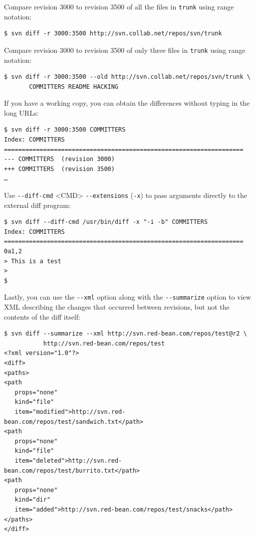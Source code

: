 Compare revision 3000 to revision 3500 of all the files in
\texttt{trunk} using range notation:

\begin{verbatim}
$ svn diff -r 3000:3500 http://svn.collab.net/repos/svn/trunk
\end{verbatim}

Compare revision 3000 to revision 3500 of only three files in
\texttt{trunk} using range notation:

\begin{verbatim}
$ svn diff -r 3000:3500 --old http://svn.collab.net/repos/svn/trunk \
       COMMITTERS README HACKING
\end{verbatim}

If you have a working copy, you can obtain the differences without
typing in the long URLs:

\begin{verbatim}
$ svn diff -r 3000:3500 COMMITTERS 
Index: COMMITTERS
===================================================================
--- COMMITTERS  (revision 3000)
+++ COMMITTERS  (revision 3500)
…
\end{verbatim}

Use \texttt{-\/-diff-cmd} \textless CMD\textgreater{}
\texttt{-\/-extensions} (\texttt{-x}) to pass arguments directly to the
external diff program:

\begin{verbatim}
$ svn diff --diff-cmd /usr/bin/diff -x "-i -b" COMMITTERS 
Index: COMMITTERS
===================================================================
0a1,2
> This is a test
> 
$
\end{verbatim}

Lastly, you can use the \texttt{-\/-xml} option along with the
\texttt{-\/-summarize} option to view XML describing the changes that
occurred between revisions, but not the contents of the diff itself:

\begin{verbatim}
$ svn diff --summarize --xml http://svn.red-bean.com/repos/test@r2 \
           http://svn.red-bean.com/repos/test
<?xml version="1.0"?>
<diff>
<paths>
<path
   props="none"
   kind="file"
   item="modified">http://svn.red-bean.com/repos/test/sandwich.txt</path>
<path
   props="none"
   kind="file"
   item="deleted">http://svn.red-bean.com/repos/test/burrito.txt</path>
<path
   props="none"
   kind="dir"
   item="added">http://svn.red-bean.com/repos/test/snacks</path>
</paths>
</diff>
\end{verbatim}

